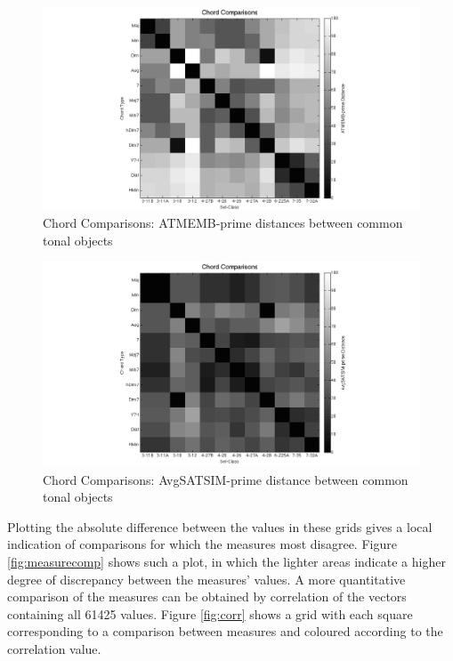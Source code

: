 \documentclass{article}
\begin{document}
\begin{figure}[htb]
\centering
\includegraphics[width=.6\linewidth]{./plots/chordcomp1.png}
\caption{\label{fig:chordcomp1}Chord Comparisons: ATMEMB-prime distances between common tonal objects}
\end{figure}
\begin{figure}[htb]
\centering
\includegraphics[width=.6\linewidth]{./plots/chordcomp2.png}
\caption{\label{fig:chordcomp2}Chord Comparisons: AvgSATSIM-prime distance between common tonal objects}
\end{figure}

Plotting the absolute difference between the values in these grids
gives a local indication of comparisons for which the measures most
disagree. Figure \ref{fig:measurecomp} shows such a plot, in which the
lighter areas indicate a higher degree of discrepancy between the
measures' values. A more quantitative comparison of the measures can
be obtained by correlation of the vectors containing all 61425
values. Figure \ref{fig:corr} shows a grid with each square
corresponding to a comparison between measures and coloured according
to the correlation value.
\end{document}
